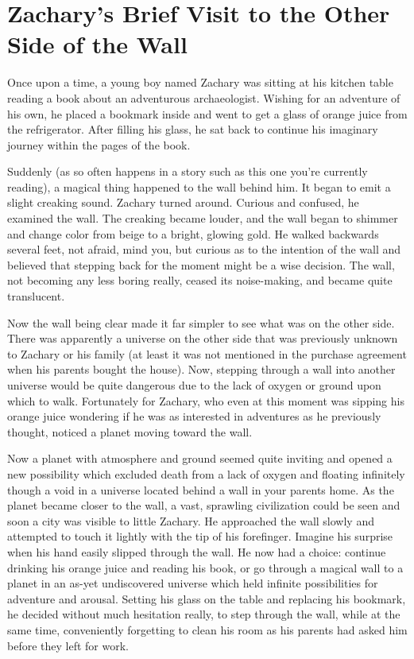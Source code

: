 \chapter{Zachary's Brief Visit to the Other Side of the Wall}

Once upon a time, a young boy named Zachary was sitting at his kitchen table reading a book about an adventurous archaeologist. Wishing for an adventure of his own, he placed a bookmark inside and went to get a glass of orange juice from the refrigerator. After filling his glass, he sat back to continue his imaginary journey within the pages of the book.

Suddenly (as so often happens in a story such as this one you're currently reading), a magical thing happened to the wall behind him. It began to emit a slight creaking sound. Zachary turned around. Curious and confused, he examined the wall. The creaking became louder, and the wall began to shimmer and change color from beige to a bright, glowing gold. He walked backwards several feet, not afraid, mind you, but curious as to the intention of the wall and believed that stepping back for the moment might be a wise decision. The wall, not becoming any less boring really, ceased its noise-making, and became quite translucent.

Now the wall being clear made it far simpler to see what was on the other side. There was apparently a universe on the other side that was previously unknown to Zachary or his family (at least it was not mentioned in the purchase agreement when his parents bought the house). Now, stepping through a wall into another universe would be quite dangerous due to the lack of oxygen or ground upon which to walk. Fortunately for Zachary, who even at this moment was sipping his orange juice wondering if he was as interested in adventures as he previously thought, noticed a planet moving toward the wall.

Now a planet with atmosphere and ground seemed quite inviting and opened a new possibility which excluded death from a lack of oxygen and floating infinitely though a void in a universe located behind a wall in your parents home. As the planet became closer to the wall, a vast, sprawling civilization could be seen and soon a city was visible to little Zachary. He approached the wall slowly and attempted to touch it lightly with the tip of his forefinger. Imagine his surprise when his hand easily slipped through the wall. He now had a choice: continue drinking his orange juice and reading his book, or go through a magical wall to a planet in an as-yet undiscovered universe which held infinite possibilities for adventure and arousal. Setting his glass on the table and replacing his bookmark, he decided without much hesitation really, to step through the wall, while at the same time, conveniently forgetting to clean his room as his parents had asked him before they left for work.


